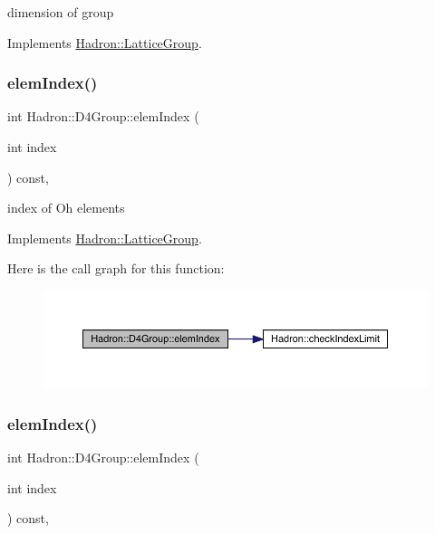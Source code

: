 dimension of group 

Implements \mbox{\hyperlink{structHadron_1_1LatticeGroup_abd8415698323796ef6a8605796ee3bea}{Hadron\+::\+Lattice\+Group}}.

\mbox{\label{structHadron_1_1D4Group_aa4ca8a3f1bc6774b630cd6a354179298}} 
\subsubsection{\texorpdfstring{elemIndex()}{elemIndex()}\hspace{0.1cm}{\footnotesize\ttfamily [1/2]}}
{\footnotesize\ttfamily int Hadron\+::\+D4\+Group\+::elem\+Index (\begin{DoxyParamCaption}\item[{int}]{index }\end{DoxyParamCaption}) const\hspace{0.3cm}{\ttfamily [inline]}, {\ttfamily [virtual]}}

index of Oh elements 

Implements \mbox{\hyperlink{structHadron_1_1LatticeGroup_afb8e3ee60de059f75bce1044c694e1e8}{Hadron\+::\+Lattice\+Group}}.

Here is the call graph for this function\+:
\nopagebreak
\begin{figure}[H]
\begin{center}
\leavevmode
\includegraphics[width=350pt]{de/d5e/structHadron_1_1D4Group_aa4ca8a3f1bc6774b630cd6a354179298_cgraph}
\end{center}
\end{figure}
\mbox{\label{structHadron_1_1D4Group_aa4ca8a3f1bc6774b630cd6a354179298}} 
\subsubsection{\texorpdfstring{elemIndex()}{elemIndex()}\hspace{0.1cm}{\footnotesize\ttfamily [2/2]}}
{\footnotesize\ttfamily int Hadron\+::\+D4\+Group\+::elem\+Index (\begin{DoxyParamCaption}\item[{int}]{index }\end{DoxyParamCaption}) const\hspace{0.3cm}{\ttfamily [inline]}, {\ttfamily [virtual]}}

